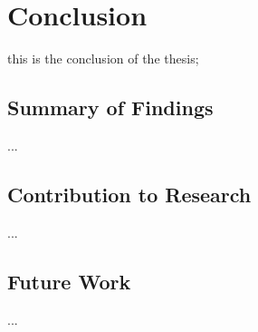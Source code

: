 \chapter{Conclusion}
this is the conclusion of the thesis; \cite{EC_DIGIT_CloudSovereignty_2025}

\section{Summary of Findings}
...
\section{Contribution to Research}
...
\section{Future Work}
...